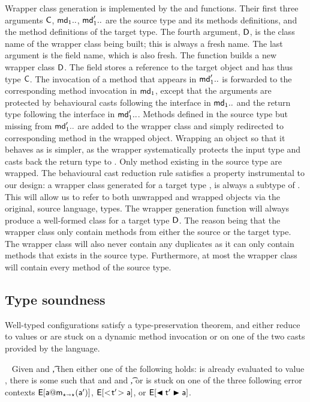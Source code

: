 \documentclass[acmlarge, anonymous, authordraft, review]{acmart} %
\begin{document}
Wrapper class generation is implemented by the  and 
functions. Their first three arguments \(\C\), \(\md[1]..\), \(\mdp[1]..\)
are the source type and its methods definitions, and the method definitions
of the target type. The fourth argument, \(\D\), is the class name of the
wrapper class being built; this is always a fresh name. The last argument is
the \that field name, which is also fresh.  The function builds a new
wrapper class \(\D\).  The field \that stores a reference to the target
object and has thus type \(\C\).  The invocation of a method that appears in
\(\mdp[1]..\) is forwarded to the corresponding method invocation in
\(\md[1]\), except that the arguments are protected by behavioural casts
following the interface in \(\md[1]..\) and the return type following the
interface in \(\mdp[1]..\).  Methods defined in the source type but missing
from \(\mdp[1]..\) are added to the wrapper class and simply redirected to
corresponding method in the wrapped object.  Wrapping an object so that it
behaves as \any is simpler, as the wrapper systematically protects the input
type and casts back the return type to \any. Only method existing in the
source type are wrapped. The behavioural cast reduction rule satisfies a
property instrumental to our design: a wrapper class generated for a target
type \D, is always a subtype of \D.  This will allow us to refer to both
unwrapped and wrapped objects via the original, source language, types. The
wrapper generation function will always produce a well-formed class for a
target type $\D$. The reason being that the wrapper class only contain
methods from either the source or the target type. The wrapper class will
also never contain any duplicates as it can only contain methods that exists
in the source type.  Furthermore, at most the wrapper class will contain
every method of the source type.

\subsection{Type soundness} 
Well-typed \kafka configurations satisfy a type-preservation theorem, and
either reduce to values or are stuck on a dynamic method invocation or on
one of the two casts provided by the language.

\medskip{} ~  
Given \WFp\K{\e~\s} and
      \EnvType\cdot\s\K\e\t,
then either one of the following holds:
    \e is already evaluated to value \a,      
    there is some \ep such that \Reduce \K\e\s \Kp\ep\sp and
       \WFp\Kp{\ep~\sp} and \EnvType\cdot\sp\Kp\ep\t,
or \e is stuck on one of the three following error contexts
    $\EE[\DynCall\a\m{\ap}]$,
    $\EE[\SubCast\tp\a]$,
   or $\EE[\BehCast\tp\a]$.\\
\end{document}
